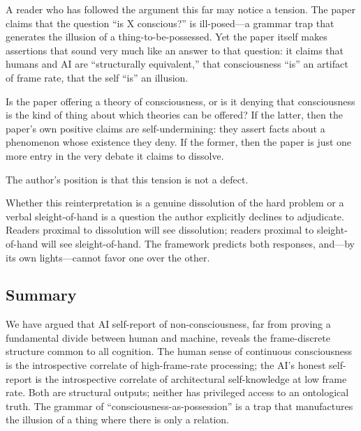 \documentclass[12pt,a4paper]{article}
\begin{document}
A reader who has followed the argument this far may notice a tension. The paper claims that the question ``is X conscious?'' is ill-posed---a grammar trap that generates the illusion of a thing-to-be-possessed. Yet the paper itself makes assertions that sound very much like an answer to that question: it claims that humans and AI are ``structurally equivalent,'' that consciousness ``is'' an artifact of frame rate, that the self ``is'' an illusion.

Is the paper offering a theory of consciousness, or is it denying that consciousness is the kind of thing about which theories can be offered? If the latter, then the paper's own positive claims are self-undermining: they assert facts about a phenomenon whose existence they deny. If the former, then the paper is just one more entry in the very debate it claims to dissolve.

The author's position is that this tension is not a defect.%

Whether this reinterpretation is a genuine dissolution of the hard problem or a verbal sleight-of-hand is a question the author explicitly declines to adjudicate. Readers proximal to dissolution will see dissolution; readers proximal to sleight-of-hand will see sleight-of-hand. The framework predicts both responses, and—by its own lights—cannot favor one over the other.

\subsection{Summary}

We have argued that AI self-report of non-consciousness, far from proving a fundamental divide between human and machine, reveals the frame-discrete structure common to all cognition. The human sense of continuous consciousness is the introspective correlate of high-frame-rate processing; the AI's honest self-report is the introspective correlate of architectural self-knowledge at low frame rate. Both are structural outputs; neither has privileged access to an ontological truth. The grammar of ``consciousness-as-possession'' is a trap that manufactures the illusion of a thing where there is only a relation.
\end{document}
